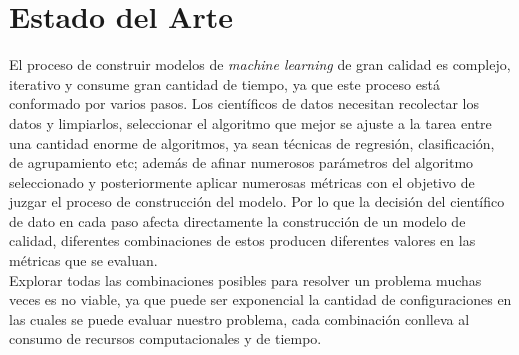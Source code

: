 \chapter{Estado del Arte}\label{chapter:state-of-the-art}

El proceso de construir modelos de \textit{machine learning} de gran calidad es complejo, iterativo y consume gran cantidad de tiempo, ya que este proceso está conformado por varios pasos. Los científicos de datos necesitan recolectar los datos y limpiarlos, seleccionar el algoritmo que mejor se ajuste a la tarea entre una cantidad enorme de algoritmos, ya sean técnicas de regresión, clasificación, de agrupamiento etc; además de afinar numerosos parámetros del algoritmo seleccionado y posteriormente aplicar numerosas métricas con el objetivo de juzgar el proceso de construcción del modelo. Por lo que la decisión del científico de dato en cada paso afecta directamente la construcción de un modelo de calidad, diferentes combinaciones de estos producen diferentes valores en las métricas que se evaluan. \\

Explorar todas las combinaciones posibles para resolver un problema muchas veces es no viable, ya que puede ser exponencial la cantidad de configuraciones en las cuales se puede evaluar nuestro problema, cada combinación conlleva al consumo de recursos computacionales y de tiempo. \\

